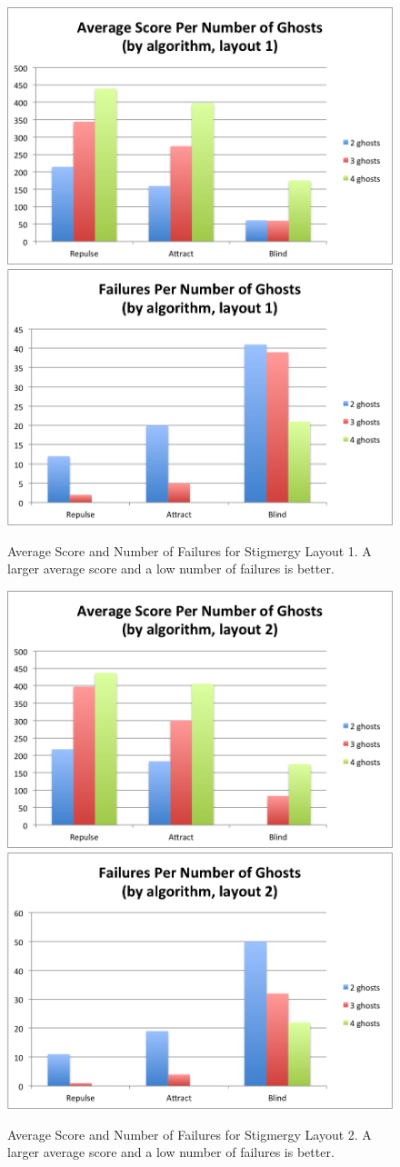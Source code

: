 \documentclass[11pt]{article}
\begin{document}
\begin{figure}[H]
	\includegraphics[width=0.5 \columnwidth]{stigmergytrendclassicscore.png}
	\includegraphics[width= 0.5 \columnwidth]{stigmergytrendclassicfail.png}
	\caption{Average Score and Number of Failures for Stigmergy Layout 1.  A larger average score and a low number of failures is better.}
	\label{fig:stigmergystats1}
\end{figure}

\begin{figure}[H]
	\includegraphics[width=0.5 \columnwidth]{stigmergytrendaltscore.png}
	\includegraphics[width= 0.5 \columnwidth]{stigmergytrendaltfail.png}
	\caption{Average Score and Number of Failures for Stigmergy Layout 2. A larger average score and a low number of failures is better.}
	\label{fig:stigmergystats2}
\end{figure}
\end{document}
